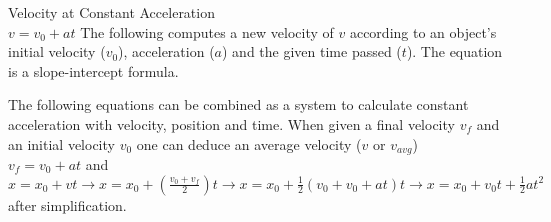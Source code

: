 \documentclass{article}
\begin{document}
\noindent
\Large
Velocity at Constant Acceleration\\
\normalsize
\noindent
$v = v_0 + at$
The following computes a new velocity of $v$ according to an object's initial velocity ($v_0$), acceleration ($a$) and the given time passed ($t$). The equation is a slope-intercept formula.

\indent
The following equations can be combined as a system to calculate constant acceleration with velocity, position and time.
When given a final velocity $v_f$ and an initial velocity $v_0$ one can deduce an average velocity ($v$ or $v_{avg}$)\\
$v_f = v_0 + at$ and $x = x_0 + vt \to x = x_0 + (\frac{v_0 + v_f}{2})t \to x = x_0 + \frac{1}{2}(v_0 + v_0 + at)t \to x = x_0 + v_0t + \frac{1}{2}at^2$ after simplification.
\end{document}
